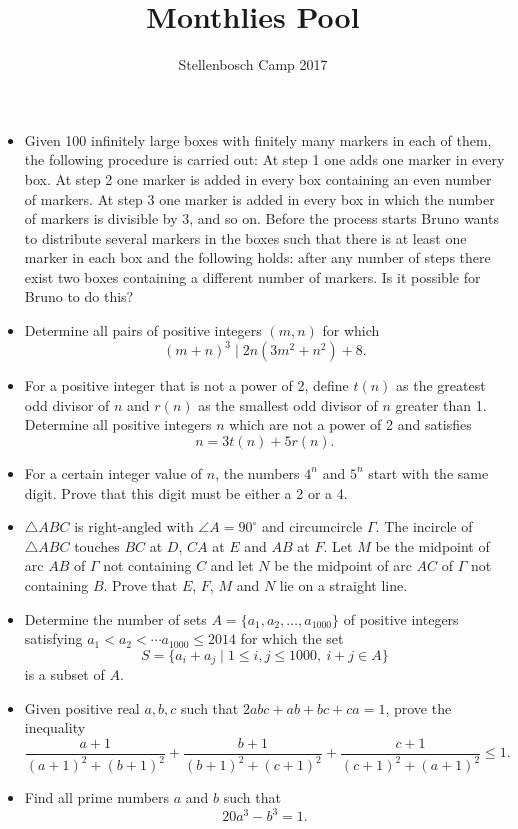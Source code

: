 \documentclass[12pt]{article}
\title{Monthlies Pool}
\author{Stellenbosch Camp 2017}
\begin{document}
 \maketitle

\begin{itemize}

\item %
Given 100 infinitely large boxes with finitely many markers in each of them, the following procedure is carried out: At step 1 one adds one marker in every box. At step 2 one marker is added in every box containing an even number of markers. At step 3 one marker is added in every box in which the number of markers is divisible by 3, and so on. Before the process starts Bruno wants to distribute several markers in the boxes such that there is at least one marker in each box and the following holds: after any number of steps there exist two boxes containing a different number of markers. Is it possible for Bruno to do this?


\item %
Determine all pairs of positive integers $(m,n)$ for which
	\[(m+n)^3 \mid 2n(3m^2+n^2) + 8.\]


\item %
For a positive integer that is not a power of 2, define $t(n)$ as the greatest odd divisor of $n$ and $r(n)$ as the smallest odd divisor of $n$ greater than 1. Determine all positive integers $n$ which are not a power of 2 and satisfies
	\[ n = 3t(n)+5r(n).\]


\item %
For a certain integer value of $n$, the numbers $4^n$ and $5^n$ start with the same digit. Prove that this digit must be either a 2 or a 4.


\item %
$\triangle ABC$ is right-angled with $\angle A=90^\circ$ and circumcircle $\Gamma$. The incircle of $\triangle ABC$ touches $BC$ at $D$, $CA$ at $E$ and $AB$ at $F$. Let $M$ be the midpoint of arc $AB$ of $\Gamma$ not containing $C$ and let $N$ be the midpoint of arc $AC$ of $\Gamma$ not containing $B$. Prove that $E$, $F$, $M$ and $N$ lie on a straight line.


\item %
Determine the number of sets $A = \{a_1,a_2,\ldots, a_{1000}\}$ of positive integers satisfying $a_1 < a_2 < \cdots a_{1000} \le 2014$ for which the set
	\[ S = \{a_i+a_j \mid 1\le i,j\le 1000,\ i+j\in A\} \]
is a subset of $A$.


\item %
Given positive real $a,b,c$ such that $2abc+ab+bc+ca = 1$, prove the inequality
\[ \frac{a+1}{(a+1)^2+(b+1)^2} +\frac{b+1}{(b+1)^2+(c+1)^2} +\frac{c+1}{(c+1)^2+(a+1)^2} \leq 1. \]


\item %
Find all prime numbers $a$ and $b$ such that \[ 20a^3 -b^3 = 1. \]


\end{itemize}
\end{document}
